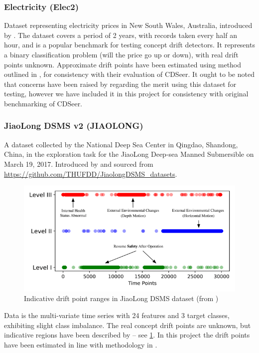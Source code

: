 \documentclass{svproc}
\begin{document}
\subsubsection{Electricity (Elec2)}Dataset representing electricity prices in New South Wales, Australia, introduced by \cite{harries1999}. The dataset covers a period of 2 years, with records taken every half an hour, and is a popular benchmark for testing concept drift detectors. 
It represents a binary classification problem (will the price go up or down), with real drift points unknown. Approximate drift points have been estimated using method outlined in \cite{pham2025}, for consistency with their evaluation of CDSeer. It ought to be noted that concerns have been raised by \cite{zliobaite2013} regarding the merit using this dataset for testing, however we have included it in this project for consistency with original benchmarking of CDSeer. 

\subsubsection{JiaoLong DSMS v2 (JIAOLONG)} A dataset collected by the National Deep Sea Center in Qingdao, Shandong, China, in the exploration task for the JiaoLong Deep-sea Manned Submersible on March 19, 2017. Introduced by \cite{liu2022} and sourced from \url{https://github.com/THUFDD/JiaolongDSMS_datasets}. 
\begin{figure}
	\centering
	\includegraphics[scale=.6]{figures/Fig9_jiaolong.png}
	\caption{Indicative drift point ranges in JiaoLong DSMS dataset (from \cite{liu2022})}
	\label{fig:fig9}
\end{figure}
Data is the multi-variate time series with 24 features and 3 target classes, exhibiting slight class imbalance. The real concept drift points are unknown, but indicative regions have been described by \cite{liu2022} – see \ref{fig:fig9}. In this project the drift points have been estimated in line with methodology in \cite{pham2025}.
\end{document}
